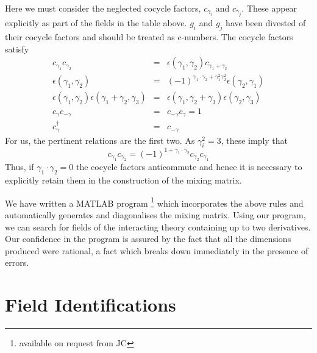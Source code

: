 \documentclass[a4paper,a4paper]{article}
\begin{document}
Here we must consider
the neglected cocycle factors, $c_{\gamma_i}$ and $c_{\gamma_j}$.  These appear explicitly as part of the fields in the table above.
$g_i$ and $g_j$ have been divested of their cocycle factors and should be treated as c-numbers.
The cocycle factors satisfy \cite{Kazama2}
\begin{eqnarray}
c_{\gamma_1}c_{\gamma_2} & = & \epsilon(\gamma_1 , \gamma_2) c_{\gamma_1 + \gamma_2} \nonumber\\
\epsilon(\gamma_1 , \gamma_2) & = & (-1)^{\gamma_1 \cdot \gamma_2 + \gamma_1^2 \gamma_2^2}\epsilon(\gamma_2 , \gamma_1) \nonumber\\
\epsilon(\gamma_1 , \gamma_2)\epsilon(\gamma_1 + \gamma_2, \gamma_3) & = & \epsilon(\gamma_1 , \gamma_2 + \gamma_3)\epsilon(\gamma_2 , \gamma_3) \\
c_{\gamma}c_{-\gamma} & = & c_{-\gamma}c_{\gamma} = 1 \nonumber\\
c_{\gamma}^{\dagger} & = & c_{-\gamma} \nonumber
\end{eqnarray}
For us, the pertinent relations are the first two. As $\gamma_i^2 = 3$, these imply that
\begin{equation}
c_{\gamma_1} c_{\gamma_2} = (-1)^{1 + \gamma_1 \cdot \gamma_2} c_{\gamma_2} c_{\gamma_1}
\end{equation}
Thus, if $\gamma_1 \cdot \gamma_2 = 0$ the cocycle factors anticommute and hence it is necessary
to explicitly retain them in the construction of the mixing matrix.

We have written a MATLAB program \footnote{available on request from JC} which incorporates the above rules and automatically generates and diagonalises 
the mixing matrix.
Using our program, we can search for fields of the interacting theory containing up to 
two derivatives. Our confidence in the program is assured by the fact that all the dimensions produced were rational,
a fact which breaks down immediately in the presence of errors.

\section{Field Identifications}
\label{Identifying Fields}
\end{document}

